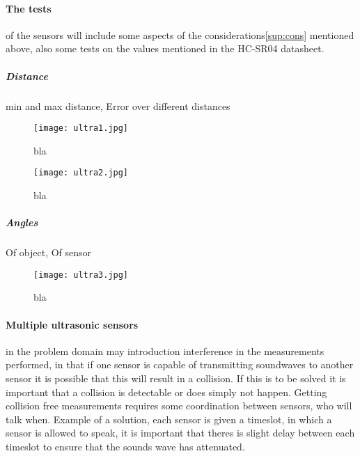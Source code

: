 \paragraph{The tests} of the sensors will include some aspects of the considerations\cref{sup:cons} mentioned above, also some tests on the values mentioned in the HC-SR04 datasheet\cite{hcsr04}.
  
  \subparagraph{Distance}
  min and max distance, Error over different distances
    \begin{figure}[htbp]
    \centering
    \texttt{[image: ultra1.jpg]}
    \caption{bla}
    \label{fig:ultra1}
  \end{figure}
    \begin{figure}[htbp]
    \centering
    \texttt{[image: ultra2.jpg]}
    \caption{bla}
    \label{fig:ultra2}
  \end{figure}
  \subparagraph{Angles}
  Of object, Of sensor
  \begin{figure}[htbp]
    \centering
    \texttt{[image: ultra3.jpg]}
    \caption{bla}
    \label{fig:ultra3}
  \end{figure}
  
\paragraph{Multiple ultrasonic sensors} in the problem domain may introduction interference in the measurements performed, in that if one sensor is capable of transmitting soundwaves to another sensor it is possible that this will result in a collision. If this is to be solved it is important that a collision is detectable or does simply not happen. Getting collision free measurements requires some coordination between sensors, who will talk when. Example of a solution, each sensor is given a timeslot, in which a sensor is allowed to speak, it is important that theres is slight delay between each timeslot to ensure that the sounds wave has attenuated.
